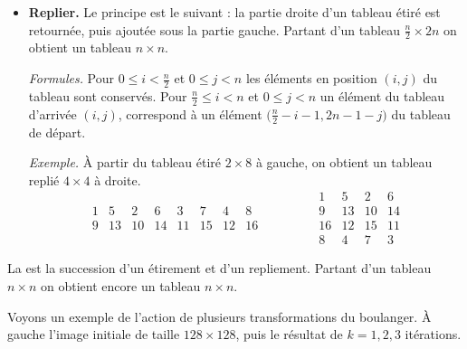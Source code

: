 \documentclass[11pt,class=report,crop=false]{standalone}
\begin{document}
\begin{cours}
\begin{itemize}
  \item \textbf{Replier.} Le principe est le suivant : la partie droite d'un tableau étiré est retournée, puis ajoutée sous la partie gauche. Partant d'un tableau $\frac n2 \times 2n$ on obtient un tableau $n \times n$.

 

\emph{Formules.} 
Pour $0 \le i < \frac n2$ et $0 \le j < n$ les éléments en position $(i,j)$ du tableau sont conservés.
Pour $\frac n2 \le i < n$ et $0 \le j < n$ un élément du tableau 
d'arrivée $(i,j)$, correspond à un élément $\big(\frac{n}{2} - i - 1,2n-1-j\big)$ du tableau de départ. 


\emph{Exemple.} 
À partir du tableau étiré $2 \times 8$ à gauche, on obtient un tableau replié $4 \times 4$ à droite. 
$$ 
\begin{array}{cccccccc} 
  1& 5& 2& 6& 3& 7& 4& 8  \\
  9&13&10&14&11&15&12&16
\end{array}\qquad\qquad
\begin{array}{cccc} 
  1& 5& 2& 6\\ 
  9& 13& 10& 14\\  
  16&12&15&11\\  
  8&4&7&3  
\end{array}$$
\end{itemize}


La  est la succession d'un étirement et d'un repliement. Partant d'un tableau $n \times n$ on obtient encore un tableau $n \times n$.


Voyons un exemple de l'action de plusieurs transformations du boulanger.
À gauche l'image initiale de taille $128 \times 128$, puis le résultat de $k=1,2,3$ itérations. 


\end{cours}
\end{document}
